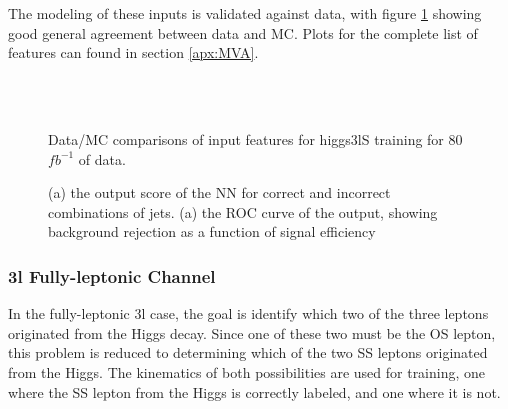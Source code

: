 The modeling of these inputs is validated against data, with figure \ref{fig:model_higgs3lS} showing good general agreement between data and MC. Plots for the complete list of features can found in section \ref{apx:MVA}.

\begin{figure}[h!]
    \\
    \\
    \caption{Data/MC comparisons of input features for higgs3lS training for 80 $fb^{-1}$ of data.}
    \label{fig:model_higgs3lS}
\end{figure} 

\begin{figure}[h!]
  \label{fig:higgs3lSresults}
  \caption{(a) the output score of the NN for correct and incorrect combinations of jets. (a) the ROC curve of the output, showing background rejection as a function of signal efficiency}
\end{figure} 


\subsubsection{3l Fully-leptonic Channel}
\label{subsec:higgs3lF}

In the fully-leptonic 3l case, the goal is identify which two of the three leptons originated from the Higgs decay. Since one of these two must be the OS lepton, this problem is reduced to determining which of the two SS leptons originated from the Higgs. The kinematics of both possibilities are used for training, one where the SS lepton from the Higgs is correctly labeled, and one where it is not.

